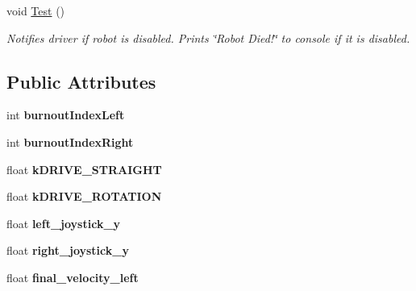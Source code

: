 \begin{DoxyCompactItemize}
\item 
\hypertarget{classMarkX_a1d52de0e82d838763d9a531181e778e4}{void \hyperlink{classMarkX_a1d52de0e82d838763d9a531181e778e4}{\-Test} ()}\label{classMarkX_a1d52de0e82d838763d9a531181e778e4}

\begin{DoxyCompactList}\small\item\em \-Notifies driver if robot is disabled. \-Prints \char`\"{}\-Robot Died!\char`\"{} to console if it is disabled. \end{DoxyCompactList}\end{DoxyCompactItemize}
\subsection*{\-Public \-Attributes}
\begin{DoxyCompactItemize}
\item 
\hypertarget{classMarkX_a8ef6326859231ebd87d014e0f73700f7}{int {\bfseries burnout\-Index\-Left}}\label{classMarkX_a8ef6326859231ebd87d014e0f73700f7}

\item 
\hypertarget{classMarkX_acda813a218e89875f8f85d8100c0b8e6}{int {\bfseries burnout\-Index\-Right}}\label{classMarkX_acda813a218e89875f8f85d8100c0b8e6}

\item 
\hypertarget{classMarkX_a9a17f12176d058f67f2553ad0c68d15c}{float {\bfseries k\-D\-R\-I\-V\-E\-\_\-\-S\-T\-R\-A\-I\-G\-H\-T}}\label{classMarkX_a9a17f12176d058f67f2553ad0c68d15c}

\item 
\hypertarget{classMarkX_ab7e09fce05029ca598abb3a78cbb16ac}{float {\bfseries k\-D\-R\-I\-V\-E\-\_\-\-R\-O\-T\-A\-T\-I\-O\-N}}\label{classMarkX_ab7e09fce05029ca598abb3a78cbb16ac}

\item 
\hypertarget{classMarkX_afe2ac4494a7f2bc0435c480a5cdcbff5}{float {\bfseries left\-\_\-joystick\-\_\-y}}\label{classMarkX_afe2ac4494a7f2bc0435c480a5cdcbff5}

\item 
\hypertarget{classMarkX_a7a4927e025ab9a39ef8715a72df903af}{float {\bfseries right\-\_\-joystick\-\_\-y}}\label{classMarkX_a7a4927e025ab9a39ef8715a72df903af}

\item 
\hypertarget{classMarkX_a4188ff8359d6611c51a54864a5409e98}{float {\bfseries final\-\_\-velocity\-\_\-left}}\label{classMarkX_a4188ff8359d6611c51a54864a5409e98}


\end{DoxyCompactItemize}
